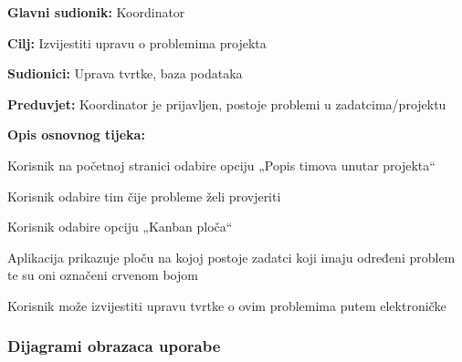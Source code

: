 							\noindent {}
							\begin{packed_item}
		
								\item \textbf{Glavni sudionik:} Koordinator
								\item  \textbf{Cilj:} Izvijestiti upravu o problemima projekta
								\item  \textbf{Sudionici:} Uprava tvrtke, baza podataka
								\item  \textbf{Preduvjet:} Koordinator je prijavljen, postoje problemi u zadatcima/projektu
								\item  \textbf{Opis osnovnog tijeka:}
		
								\item[] \begin{packed_enum}

                      				\item Korisnik na početnoj stranici odabire opciju „Popis timova unutar projekta“
                                    \item Korisnik odabire tim čije probleme želi provjeriti
                                    \item Korisnik odabire opciju „Kanban ploča“
                                    \item Aplikacija prikazuje ploču na kojoj postoje zadatci koji imaju određeni problem te su oni označeni crvenom bojom
                                    \item Korisnik može izvijestiti upravu tvrtke o ovim problemima putem elektroničke
										\end{packed_enum}
							\end{packed_item}

				\subsubsection{Dijagrami obrazaca uporabe}
					
